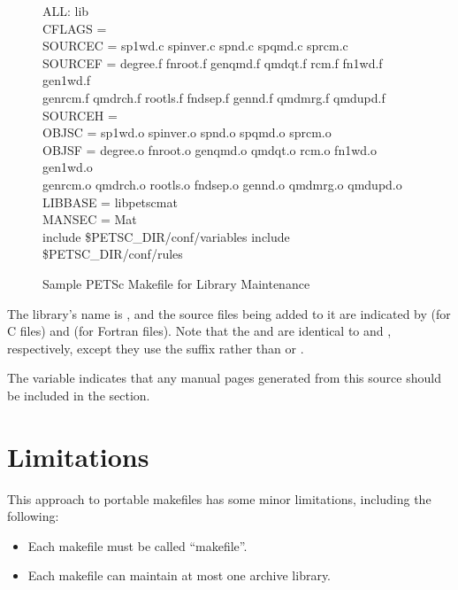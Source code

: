 {{{\begin{figure}[H]
{\small
\begin{tabbing}
   ALL: lib\\

   CFLAGS   =\\  
   SOURCEC  = sp1wd.c spinver.c spnd.c spqmd.c sprcm.c\\
   SOURCEF  = degree.f  fnroot.f genqmd.f qmdqt.f rcm.f fn1wd.f gen1wd.f \ \\
              genrcm.f qmdrch.f rootls.f fndsep.f gennd.f qmdmrg.f qmdupd.f\\
   SOURCEH  = \\
   OBJSC    = sp1wd.o spinver.o spnd.o spqmd.o sprcm.o\\
   OBJSF    = degree.o  fnroot.o genqmd.o qmdqt.o rcm.o fn1wd.o gen1wd.o \ \\
              genrcm.o qmdrch.o rootls.o fndsep.o gennd.o qmdmrg.o qmdupd.o\\
   LIBBASE  = libpetscmat\\
   MANSEC   = Mat\\

   include \${PETSC\_DIR}/conf/variables
   include \${PETSC\_DIR}/conf/rules
\end{tabbing}
}
\caption{Sample PETSc Makefile for Library Maintenance}
\label{fig_make3}
\end{figure}

The library's name is , and the source files being added
to it are indicated by  (for C files) and  (for 
Fortran files). Note that the  and  are identical 
to  and , respectively, except they use the
suffix  rather than  or . 

The variable  indicates that any manual pages generated
from this source should be included in the  section. 

\section{Limitations}

This approach to portable makefiles has some minor limitations, including
the following:
\begin{itemize}
\item Each makefile must be called ``makefile''.
\item Each makefile can maintain at most one archive library.
\end{itemize}


}}}

